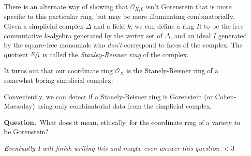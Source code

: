 \documentclass[11pt]{article}
\newcommand{\Question}{\noindent\textbf{Question.}~}
\begin{document}
    There is an alternate way of showing that \(\mathcal{O}_{X,0}\) isn't Gorenstein that is more specific to this particular ring, but may be more illuminating combinatorially. Given a simplicial complex \(\Delta\) and a field \(k\), we can define a ring \(R\) to be the free commutative \(k\)-algebra generated by the vertex set of \(\Delta\), and an ideal \(I\) generated by the square-free monomials who \textit{don't} correspond to faces of the complex. The quotient \(\sfrac{R}{I}\) is called the \textit{Stanley-Reisner ring} of the complex. 
    
    It turns out that our coordinate ring \(\mathcal{O}_{X}\) is the Stanely-Reisner ring of a somewhat boring simplicial complex:  

	Conveniently, we can detect if a Stanely-Reisner ring is Gorenstein (or Cohen-Macaulay) using only combinatorial data from the simplicial complex. 

    \Question What does it mean, ethically, for the coordinate ring of a variety to be Gorenstein?
    
    \textit{Eventually I will finish writing this and maybe even answer this question \(<3\)}
    \newpage
    \printbibliography[title={Bibliography}]
\end{document}
